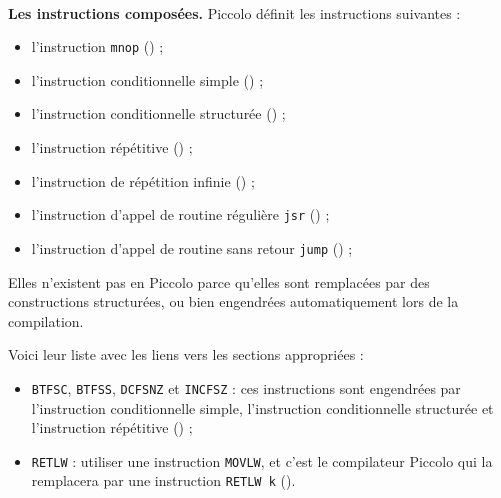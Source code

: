 ~\\
\textbf{Les instructions composées.} Piccolo définit les instructions suivantes :
\begin{itemize}
  \item l'instruction \texttt{mnop} () ;
  \item l'instruction conditionnelle simple () ;
  \item l'instruction conditionnelle structurée () ;
  \item l'instruction répétitive () ;
  \item l'instruction de répétition infinie () ;
  \item l'instruction d'appel de routine régulière \texttt{jsr} () ;
  \item l'instruction d'appel de routine sans retour \texttt{jump} () ;
\end{itemize}





Elles n’existent pas en Piccolo parce qu’elles sont remplacées par des constructions structurées, ou bien engendrées automatiquement lors de la compilation.

Voici leur liste avec les liens vers les sections appropriées :\begin{itemize}
  \item \texttt{BTFSC}, \texttt{BTFSS}, \texttt{DCFSNZ} et \texttt{INCFSZ} : ces instructions sont engendrées par l’instruction conditionnelle simple, l’instruction conditionnelle structurée et l’instruction répétitive () ;
  \item \texttt{RETLW} : utiliser une instruction \texttt{MOVLW}, et c’est le compilateur Piccolo qui la remplacera par une instruction \texttt{RETLW k} ().

\end{itemize}







